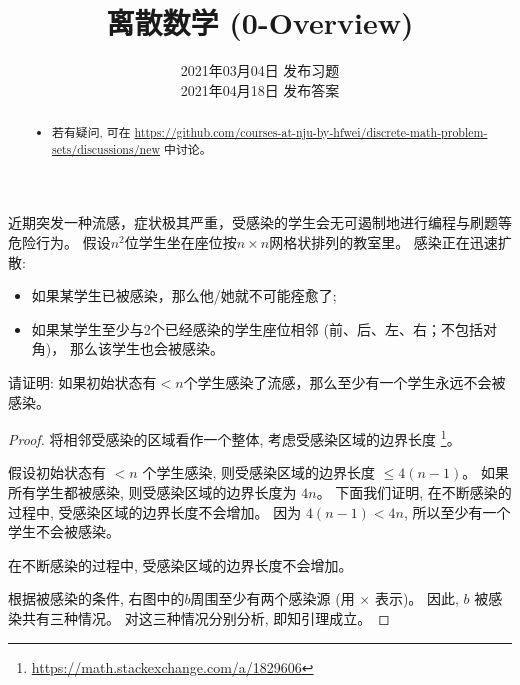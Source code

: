 \documentclass[a4paper, justified]{tufte-handout}
\title{离散数学 (0-Overview)}
\date{2021年03月04日 发布习题 \\ 2021年04月18日 发布答案}
\begin{document}
\maketitle
\noplagiarism %
\begin{abstract}
  \begin{itemize}
    \item 若有疑问, 可在 \url{https://github.com/courses-at-nju-by-hfwei/discrete-math-problem-sets/discussions/new}
      中讨论。
  \end{itemize}
\end{abstract}
\beginrequired
\begin{problem}
  近期突发一种流感，症状极其严重，受感染的学生会无可遏制地进行编程与刷题等危险行为。
  假设$n^2$位学生坐在座位按$n \times n$网格状排列的教室里。
  感染正在迅速扩散:
  \begin{itemize}
    \item 如果某学生已被感染，那么他/她就不可能痊愈了;
    \item 如果某学生至少与2个已经感染的学生座位相邻 (前、后、左、右；不包括对角)，
      那么该学生也会被感染。
  \end{itemize}
  请证明: 如果初始状态有$< n$个学生感染了流感，那么至少有一个学生永远不会被感染。
\end{problem}

\begin{proof}
  将相邻受感染的区域看作一个整体, 考虑受感染区域的边界长度
  \footnote{\url{https://math.stackexchange.com/a/1829606}}。

  假设初始状态有 $< n$ 个学生感染, 则受感染区域的边界长度 $\le 4(n-1)$。
  如果所有学生都被感染, 则受感染区域的边界长度为 $4n$。
  下面我们证明, 在不断感染的过程中, 受感染区域的边界长度不会增加。
  因为 $4 (n-1) < 4n$, 所以至少有一个学生不会被感染。

  \begin{lemma*}
    在不断感染的过程中, 受感染区域的边界长度不会增加。
  \end{lemma*}

  根据被感染的条件, 右图中的$b$周围至少有两个感染源 (用 $\times$ 表示)。
  因此, $b$ 被感染共有三种情况。
  对这三种情况分别分析, 即知引理成立。
\end{proof}
\end{document}
